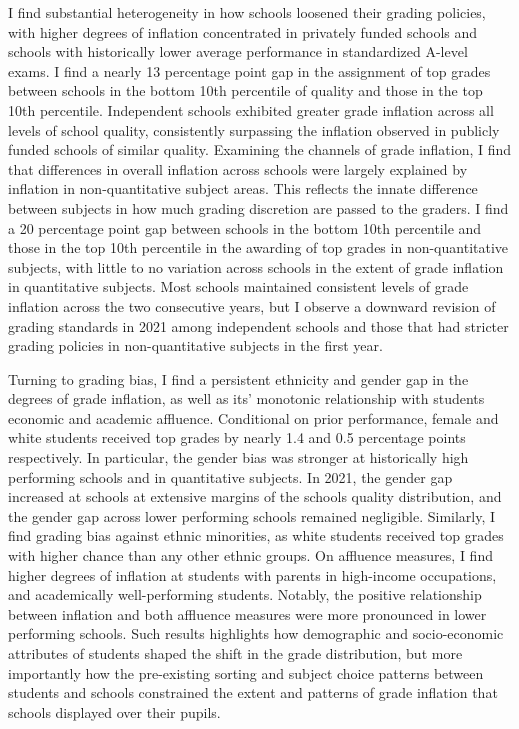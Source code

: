 I find substantial heterogeneity in how schools loosened their grading policies, with higher degrees of inflation concentrated in privately funded schools and schools with historically lower average performance in standardized A-level exams. I find a nearly 13 percentage point gap in the assignment of top grades between schools in the bottom 10th percentile of quality and those in the top 10th percentile. Independent schools exhibited greater grade inflation across all levels of school quality, consistently surpassing the inflation observed in publicly funded schools of similar quality. Examining the channels of grade inflation, I find that differences in overall inflation across schools were largely explained by inflation in non-quantitative subject areas. This reflects the innate difference between subjects in how much grading discretion are passed to the graders. I find a 20 percentage point gap between schools in the bottom 10th percentile and those in the top 10th percentile in the awarding of top grades in non-quantitative subjects, with little to no variation across schools in the extent of grade inflation in quantitative subjects. Most schools maintained consistent levels of grade inflation across the two consecutive years, but I observe a downward revision of grading standards in 2021 among independent schools and those that had stricter grading policies in non-quantitative subjects in the first year.

Turning to grading bias, I find a persistent ethnicity and gender gap in the degrees of grade inflation, as well as its' monotonic relationship with students economic and academic affluence. Conditional on prior performance, female and white students received top grades by nearly 1.4 and 0.5 percentage points respectively. In particular, the gender bias was stronger at historically high performing schools and in quantitative subjects. In 2021, the gender gap increased at schools at extensive margins of the schools quality distribution, and the gender gap across lower performing schools remained negligible. Similarly, I find grading bias against ethnic minorities, as white students received top grades with higher chance than any other ethnic groups. On affluence measures, I find higher degrees of inflation at students with parents in high-income occupations, and academically well-performing students. Notably, the positive relationship between inflation and both affluence measures were more pronounced in lower performing schools. Such results highlights how demographic and socio-economic attributes of students shaped the shift in the grade distribution, but more importantly how the pre-existing sorting and subject choice patterns between students and schools constrained the extent and patterns of grade inflation that schools displayed over their pupils. 

